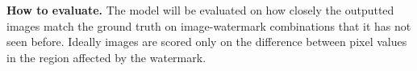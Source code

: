 \documentclass[11pt]{article}
\begin{document}
\begin{sloppypar}
\textbf{How to evaluate.}
The model will be evaluated on how closely the outputted images match the ground truth on image-watermark combinations that it has not seen before. Ideally images are scored only on the difference between pixel values in the region affected by the watermark.
\end{sloppypar}

\newpage



\pagebreak


% 
%
% 

\end{document}
